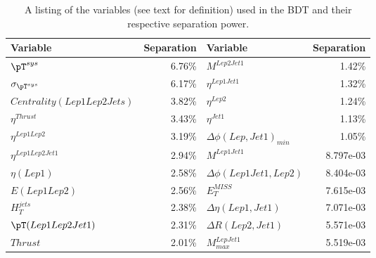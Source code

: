 \begin{table}[phtb]
  \begin{center}
    \begin{tabular}{lr|lr}
      \hline
      Variable         &  Separation          & Variable       & Separation \\
      \hline
       $\pT^{sys}$                           & 6.76\%     & $M^{Lep2Jet1}$                             & 1.42\%   \\ 
       $\sigma_{\pT^{sys}}$                  & 6.17\%     & $\eta^{Lep1Jet1}$                          & 1.32\%   \\ 
       $Centrality(Lep1Lep2Jets)$              & 3.82\%     & $\eta^{Lep2}$                            & 1.24\%  \\
       $\eta^{Thrust}$                         & 3.43\%     & $\eta^{Jet1}$                   & 1.13\%  \\
       $\eta^{Lep1Lep2}$                       & 3.19\%     & $\Delta \phi (Lep,Jet1)_{min}$         & 1.05\%  \\
       $\eta^{Lep1Lep2Jet1}$                   & 2.94\%     & $M^{Lep1Jet1}$                         & 8.797e-03  \\
       $\eta(Lep1)$                 & 2.58\%     & $\Delta \phi (Lep1Jet1,Lep2)$          & 8.404e-03  \\
       $E(Lep1Lep2)$                          & 2.56\%     & $E_T^{MISS}$                           & 7.615e-03  \\
       $H_T^{jets}$                            & 2.38\%     & $\Delta\eta (Lep1,Jet1)$               & 7.071e-03  \\
       $\pT(Lep1Lep2Jet1)$                 & 2.31\%     & $\Delta R(Lep2,Jet1)$                  & 5.571e-03  \\
       $Thrust$                                & 2.01\%     & $M^{LepJet1}_{max}$                    & 5.519e-03  \\

      \hline\hline
    \end{tabular}
    \caption{A listing of the variables (see text for definition) used in the BDT and their respective separation power.}
    \label{TABLE-BDT-VARIABLES}
  \end{center}
\end{table}

